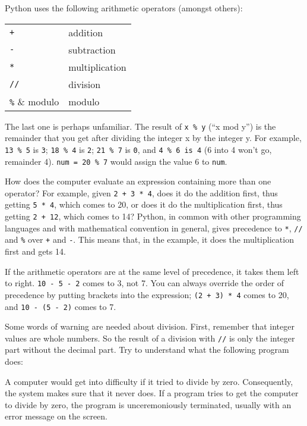 Python uses the following arithmetic operators (amongst others):
\bigskip

\begin{tabular}{ll}
\verb!+! & addition\\
\verb!-! & subtraction\\
\verb!*! & multiplication\\
\verb!//! & division\\
\verb!%! & modulo\\
\end{tabular}
\bigskip

The last one is perhaps unfamiliar.  The result of \verb!x % y! (``x mod y'')
is the remainder that you get after dividing the integer x by the integer y.
For example, \verb!13 % 5! is \verb!3!; \verb!18 % 4! is \verb!2!; 
\verb!21 % 7! is \verb!0!, and \verb!4 % 6 is 4! (6 into 4 won't go, 
remainder 4).  \verb!num = 20 % 7! would assign the value 6
to \verb!num!.

How does the computer evaluate an expression containing more than one
operator? For example, given \verb!2 + 3 * 4!, does it do the
addition first, thus getting \verb!5 * 4!, which comes to 20, or does
it do the multiplication first, thus getting \verb!2 + 12!, which
comes to 14?  Python, in common with other programming languages and
with mathematical convention in general, gives precedence to \verb!*!, \verb!//! and
\verb!%! over \verb!+! and \verb!-!.  This means that, in the example, it does the
multiplication first and gets 14.

If the arithmetic operators are at the same level of precedence, it
takes them left to right.  \verb!10 - 5 - 2! comes to 3, not 7.  You
can always override the order of precedence by putting brackets into
the expression; \verb!(2 + 3) * 4! comes to 20, and \verb!10 - (5 - 2)! comes
to 7.

Some words of warning are needed about division. First, remember that
integer values are whole numbers.
So the result of a division with \verb-//- is
only the integer part without the decimal part. Try to
understand what the following program does:
\pagebreak


A computer would get into difficulty if it tried to divide by zero.
Consequently, the system makes sure that it never does.
If a program tries to get the computer to divide by zero, the program
is unceremoniously terminated, usually with an error message on the
screen.

